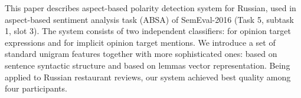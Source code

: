 This paper describes aspect-based polarity detection system for Russian, used in aspect-based sentiment analysis task (ABSA) of SemEval-2016 (Task 5, subtask 1, slot 3). The system consists of two independent classifiers: for opinion target expressions and for implicit opinion target mentions. We introduce a set of standard unigram features together with more sophisticated ones: based on sentence syntactic structure and based on lemmas vector representation. Being applied to Russian restaurant reviews, our system achieved best quality among four participants.
